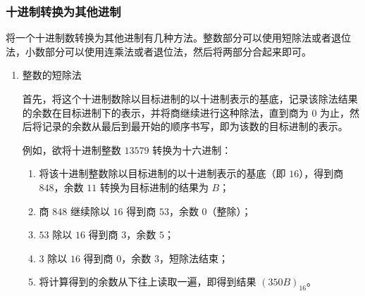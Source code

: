         \subsubsection{十进制转换为其他进制}\label{subsubsec:ArithBasics/positional-notation-presentation-and-conversion/conversion/from-decimal}
            将一个十进制数转换为其他进制有几种方法。整数部分可以使用短除法或者退位法，小数部分可以使用连乘法或者退位法，然后将两部分合起来即可。
            \begin{enumerate}
                \item 整数的短除法

                    首先，将这个十进制数除以目标进制的以十进制表示的基底，记录该除法结果的余数在目标进制下的表示，并将商继续进行这种除法，直到商为 0 为止，然后将记录的余数从最后到最开始的顺序书写，即为该数的目标进制的表示。

                    例如，欲将十进制整数 $13579$ 转换为十六进制：

                    \begin{enumerate}
                        \item 将该十进制整数除以目标进制的以十进制表示的基底（即 $16$），得到商 $848$，余数 $11$ 转换为目标进制的结果为 $B$；
                        \item 商 $848$ 继续除以 $16$ 得到商 $53$，余数 $0$（整除）；
                        \item $53$ 除以 $16$ 得到商 $3$，余数 $5$；
                        \item $3$ 除以 $16$ 得到商 $0$，余数 $3$，短除法结束；
                        \item 将计算得到的余数从下往上读取一遍，即得到结果 $(350B)_{16}$。
                    \end{enumerate}


\end{enumerate}
